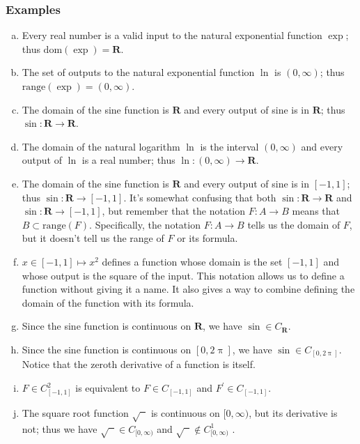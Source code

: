 \documentclass[12pt]{article}
\newenvironment{alphalist}{
  \begin{enumerate}[(a)]
    \addtolength{\itemsep}{-0.5\itemsep}}
  {\end{enumerate}}
\newcommand{\dom}{\mathrm{dom}}
\newcommand{\range}{\mathrm{range}}
\newcommand{\reals}{\mathbf{R}}
\begin{document}
\subsubsection*{Examples}

\begin{alphalist}
\item Every real number is a valid input to the natural exponential function \(\exp\); thus \(\dom(\exp) = \reals\).

\item The set of outputs to the  natural exponential function $\ln$ is \((0,\infty) \); thus \(\range(\exp) = (0,\infty)\).

\item The domain of the sine function is $\reals$ and every output of sine is in $\reals$; thus $\sin : \reals \to \reals$.

\item The domain of the natural logarithm $\ln$ is the interval $(0,\infty)$ and every output of \(\ln\) is a real number; thus
$\ln : (0,\infty) \to \reals$.

\item The domain of the sine function is $\reals$ and every output of sine is in $[-1,1]$; thus $\sin : \reals \to [-1,1]$.
It's somewhat confusing that both $\sin : \reals \to \reals$ and $\sin : \reals \to [-1,1]$, but remember that the notation
$F : A \to B$ means that $B \subset \range(F)$. Specifically,
the notation $F : A \to B$ tells us the domain of $F$, but it doesn't 
tell us the range of $F$ or its formula.


\item $x \in [-1,1] \mapsto x^2$ defines a function whose domain is the set $[-1,1]$ and whose output is the square of
the input. This notation allows us to define a function without giving 
it a name. It also gives a way to combine defining the domain of the function 
with its formula.

\item Since the sine function is continuous on \(\reals\), we have $\sin \in C_\reals$.


\item Since the sine function is continuous on \([0,2 \uppi]\), we have \(\sin \in C_{[0,2 \uppi]}\).
Notice that the zeroth derivative of a function is itself.

\item $F \in C_{[-1,1]}^2$ is equivalent to  $F \in C_{[-1,1]}$ and $F^\prime \in C_{[-1,1]}$.

\item The square root function \(\sqrt{\phantom{x}}\) is continuous on \([0,\infty)\), but its derivative is not; thus we have
\(\sqrt{\phantom{x}} \in C_{[0,\infty)} \) and  \(\sqrt{\phantom{x}} \notin C_{[0,\infty)}^1 \) .
\end{alphalist}
\end{document}
